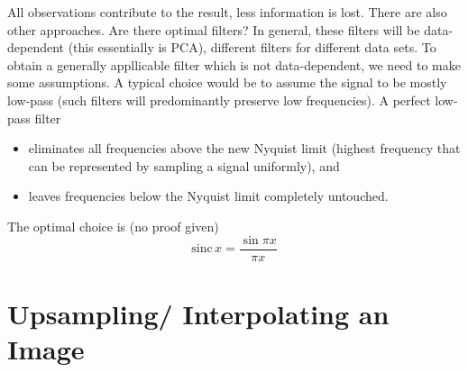 All observations contribute to the result, \ie less information is
lost. There are also other approaches. Are there optimal filters?  In
general, these filters will be data-dependent (this essentially is
PCA), \ie different filters for different data sets. To obtain a
generally appllicable filter which is not data-dependent, we need to
make some assumptions. A typical choice would be to assume the signal
to be mostly low-pass (such filters will predominantly preserve low
frequencies). A perfect low-pass filter
\begin{itemize}
\item eliminates all frequencies above the new Nyquist limit (highest
  frequency that can be represented by sampling a signal uniformly),
  and
\item leaves frequencies below the Nyquist limit completely untouched.
\end{itemize}
The optimal choice is (no proof given)
\begin{equation*}
  \text{sinc}\,x = \frac{\sin \pi x}{\pi x}
\end{equation*}

\section{Upsampling/ Interpolating an Image}

